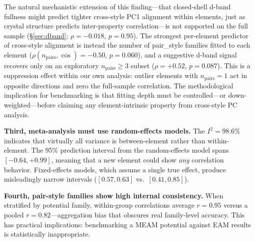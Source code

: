\documentclass[twocolumn,9pt]{extarticle}
\begin{document}
The natural mechanistic extension of this finding---that closed-shell d-band fullness might predict tighter cross-style PC1 alignment within elements, just as crystal structure predicts inter-property correlation---is not supported on the full sample (\S\ref{sec:dband}; $\rho = -0.018$, $p = 0.95$). The strongest per-element predictor of cross-style alignment is instead the number of pair\_style families fitted to each element ($\rho(n_{\text{pairs}}, \overline{\cos}) = -0.50$, $p = 0.060$), and a suggestive d-band signal recovers only on an exploratory $n_{\text{pairs}} \geq 3$ subset ($\rho = +0.52$, $p = 0.087$). This is a suppression effect within our own analysis: outlier elements with $n_{\text{pairs}} = 1$ act in opposite directions and zero the full-sample correlation. The methodological implication for benchmarking is that fitting depth must be controlled---or down-weighted---before claiming any element-intrinsic property from cross-style PC analysis.

\textbf{Third, meta-analysis must use random-effects models.} The $I^2 = 98.6\%$ indicates that virtually all variance is between-element rather than within-element. The 95\% prediction interval from the random-effects model spans $[-0.64, +0.99]$, meaning that a new element could show \textit{any} correlation behavior. Fixed-effects models, which assume a single true effect, produce misleadingly narrow intervals ($[0.57, 0.63]$ vs.\ $[0.41, 0.85]$).

\textbf{Fourth, pair-style families show high internal consistency.} When stratified by potential family, within-group correlations average $r = 0.95$ versus a pooled $r = 0.82$---aggregation bias that obscures real family-level accuracy. This has practical implications: benchmarking a MEAM potential against EAM results is statistically inappropriate.
\end{document}
